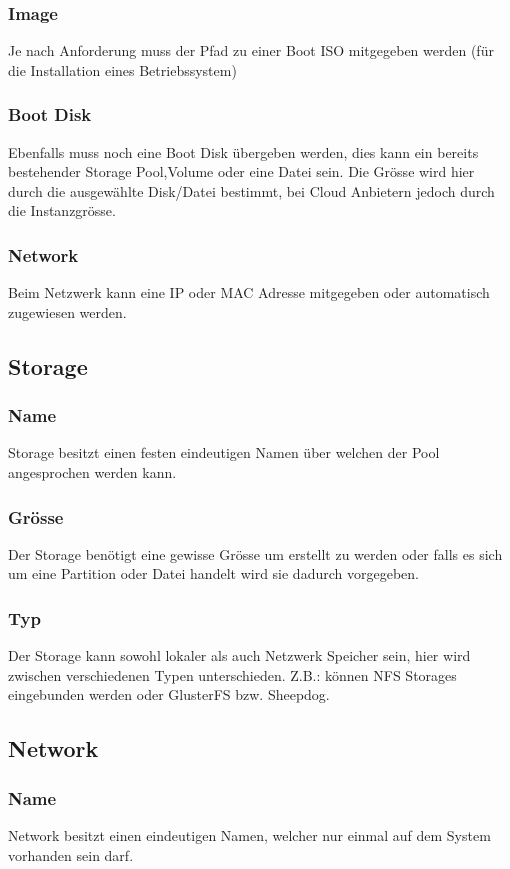 \subsubsection{Image}
Je nach Anforderung muss der Pfad zu einer Boot ISO mitgegeben werden (für die Installation eines 
Betriebssystem) 

\subsubsection{Boot Disk}
Ebenfalls muss noch eine Boot Disk übergeben werden, dies kann ein bereits 
bestehender Storage Pool,Volume oder eine Datei sein.
Die Grösse wird hier durch die ausgewählte Disk/Datei bestimmt, bei Cloud 
Anbietern jedoch durch die Instanzgrösse.

\subsubsection{Network}
Beim Netzwerk kann eine IP oder MAC Adresse mitgegeben oder automatisch zugewiesen 
werden.

\subsection{Storage}
\subsubsection{Name}
Storage besitzt einen festen eindeutigen Namen über welchen der Pool angesprochen 
werden kann.
\subsubsection{Grösse}
Der Storage benötigt eine gewisse Grösse um erstellt zu werden oder falls es 
sich um eine Partition oder Datei handelt wird sie dadurch vorgegeben.

\subsubsection{Typ}
Der Storage kann sowohl lokaler als auch Netzwerk Speicher sein, hier wird 
zwischen verschiedenen Typen unterschieden.
Z.B.: können NFS Storages eingebunden werden oder GlusterFS bzw. Sheepdog.

\subsection{Network}
\subsubsection{Name}
Network besitzt einen eindeutigen Namen, welcher nur einmal auf dem System 
vorhanden sein darf.

